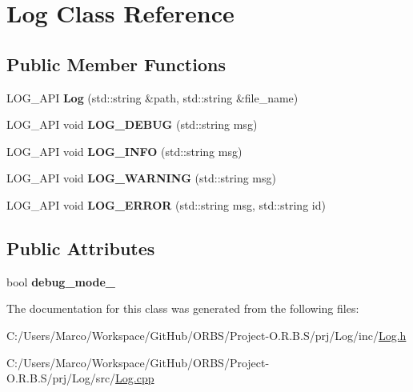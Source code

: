 \hypertarget{class_log}{\section{Log Class Reference}
\label{class_log}
}
\subsection*{Public Member Functions}
\begin{DoxyCompactItemize}
\item 
\hypertarget{class_log_aef48ac0fa78a4c1b43bb281144c907a6}{L\-O\-G\-\_\-\-A\-P\-I {\bfseries Log} (std\-::string \&path, std\-::string \&file\-\_\-name)}\label{class_log_aef48ac0fa78a4c1b43bb281144c907a6}

\item 
\hypertarget{class_log_aa450b7435e7049d85afbae45b9642274}{L\-O\-G\-\_\-\-A\-P\-I void {\bfseries L\-O\-G\-\_\-\-D\-E\-B\-U\-G} (std\-::string msg)}\label{class_log_aa450b7435e7049d85afbae45b9642274}

\item 
\hypertarget{class_log_abfab2433c1eb46a78e27446506ad2eb5}{L\-O\-G\-\_\-\-A\-P\-I void {\bfseries L\-O\-G\-\_\-\-I\-N\-F\-O} (std\-::string msg)}\label{class_log_abfab2433c1eb46a78e27446506ad2eb5}

\item 
\hypertarget{class_log_a4010e56d8e523c0a5f2b92e92676192a}{L\-O\-G\-\_\-\-A\-P\-I void {\bfseries L\-O\-G\-\_\-\-W\-A\-R\-N\-I\-N\-G} (std\-::string msg)}\label{class_log_a4010e56d8e523c0a5f2b92e92676192a}

\item 
\hypertarget{class_log_ac2700eb2c8f3e0169dab13c080527468}{L\-O\-G\-\_\-\-A\-P\-I void {\bfseries L\-O\-G\-\_\-\-E\-R\-R\-O\-R} (std\-::string msg, std\-::string id)}\label{class_log_ac2700eb2c8f3e0169dab13c080527468}

\end{DoxyCompactItemize}
\subsection*{Public Attributes}
\begin{DoxyCompactItemize}
\item 
\hypertarget{class_log_a12ba1925c1d6b0d363cafbca538da3e6}{bool {\bfseries debug\-\_\-mode\-\_\-}}\label{class_log_a12ba1925c1d6b0d363cafbca538da3e6}

\end{DoxyCompactItemize}


The documentation for this class was generated from the following files\-:\begin{DoxyCompactItemize}
\item 
C\-:/\-Users/\-Marco/\-Workspace/\-Git\-Hub/\-O\-R\-B\-S/\-Project-\/\-O.\-R.\-B.\-S/prj/\-Log/inc/\hyperlink{_log_8h}{Log.\-h}\item 
C\-:/\-Users/\-Marco/\-Workspace/\-Git\-Hub/\-O\-R\-B\-S/\-Project-\/\-O.\-R.\-B.\-S/prj/\-Log/src/\hyperlink{_log_8cpp}{Log.\-cpp}\end{DoxyCompactItemize}
